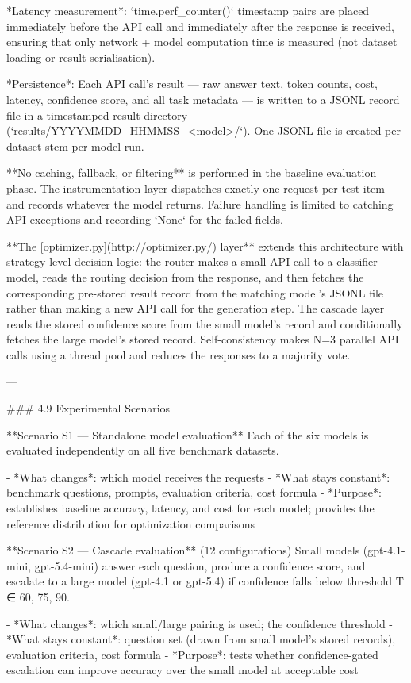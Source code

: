 *Latency measurement*: `time.perf_counter()` timestamp pairs are placed immediately before the API call and immediately after the response is received, ensuring that only network + model computation time is measured (not dataset loading or result serialisation).

*Persistence*: Each API call's result — raw answer text, token counts, cost, latency, confidence score, and all task metadata — is written to a JSONL record file in a timestamped result directory (`results/YYYYMMDD_HHMMSS_<model>/`). One JSONL file is created per dataset stem per model run.

**No caching, fallback, or filtering** is performed in the baseline evaluation phase. The instrumentation layer dispatches exactly one request per test item and records whatever the model returns. Failure handling is limited to catching API exceptions and recording `None` for the failed fields.

**The [optimizer.py](http://optimizer.py/) layer** extends this architecture with strategy-level decision logic: the router makes a small API call to a classifier model, reads the routing decision from the response, and then fetches the corresponding pre-stored result record from the matching model's JSONL file rather than making a new API call for the generation step. The cascade layer reads the stored confidence score from the small model's record and conditionally fetches the large model's stored record. Self-consistency makes N=3 parallel API calls using a thread pool and reduces the responses to a majority vote.

---

### 4.9 Experimental Scenarios

**Scenario S1 — Standalone model evaluation**
Each of the six models is evaluated independently on all five benchmark datasets.

- *What changes*: which model receives the requests
- *What stays constant*: benchmark questions, prompts, evaluation criteria, cost formula
- *Purpose*: establishes baseline accuracy, latency, and cost for each model; provides the reference distribution for optimization comparisons

**Scenario S2 — Cascade evaluation** (12 configurations)
Small models (gpt-4.1-mini, gpt-5.4-mini) answer each question, produce a confidence score, and escalate to a large model (gpt-4.1 or gpt-5.4) if confidence falls below threshold T ∈ {60, 75, 90}.

- *What changes*: which small/large pairing is used; the confidence threshold
- *What stays constant*: question set (drawn from small model's stored records), evaluation criteria, cost formula
- *Purpose*: tests whether confidence-gated escalation can improve accuracy over the small model at acceptable cost

